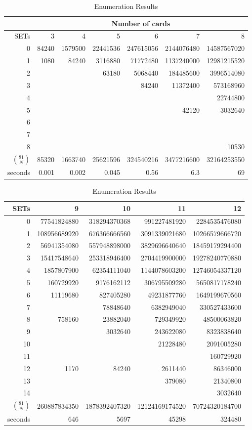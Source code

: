 \documentclass{article}
\theoremstyle{theorem}
\theoremstyle{definition}
\begin{document}
\begin{table}
  \caption{Enumeration Results}\label{THE_TABLE}
  \centering
  \begin{tabular}{r | r r r r r r }
    & \multicolumn{6}{c}{Number of cards} \\
    \hline\hline
    SETs & 3 & 4 & 5 & 6 & 7 & 8   \\
    \hline
0  & 84240 & 1579500 & 22441536 & 247615056 & 2144076480 & 14587567020  \\
1  & 1080 & 84240 & 3116880 & 71772480 & 1137240000 & 12981215520 \\
2  &  &  & 63180 & 5068440 & 184485600 & 3996514080 \\
3  &  &  &  & 84240 & 11372400 & 573168960 \\
4  &  &  &  &  &  & 22744800 \\
5  &  &  &  &  & 42120 & 3032640 \\
6  &  &  &  &  &  &  \\
7  &  &  &  &  &  &  \\
8  &  &  &  &  &  & 10530 \\
\hline
$\binom{81}{N}$ & 85320 & 1663740 & 25621596 & 324540216 & 3477216600 & 32164253550  \\
\hline
seconds & 0.001 & 0.002 & 0.045 & 0.56 & 6.3 & 69 
  \end{tabular}

  \vskip 5mm

  \begin{tabular}{r | r r r r }
    SETs & 9 & 10 & 11 & 12 \\
    \hline
0  & 77541824880 & 318294370368 & 991227481920 & 2284535476080 \\
1  & 108956689920 & 676366666560 & 3091339021680 & 10266579666720 \\
2  & 56941354080 & 557948898000 & 3829696640640 & 18459179294400 \\
3  & 15417548640 & 253318946400 & 2704419900000 & 19278240770880 \\
4  & 1857807900 & 62354111040 & 1144078603200 & 12746054337120 \\
5  & 160729920 & 9176162112 & 306795509280 & 5650817178240 \\
6  & 11119680 & 827405280 & 49231877760 & 1649199670560 \\
7  & & 78848640 & 6382949040 & 330527433600 \\
8  & 758160 & 23882040 & 729349920 & 48500063820 \\
9  &  & 3032640 & 243622080 & 8323838640 \\
10 &  &  & 21228480 & 2091005280 \\
11 &  &  & & 160729920 \\
12 & 1170 & 84240 & 2611440 & 86346000 \\
13 &  &  & 379080 & 21340800 \\
14 &  &  &  & 3032640 \\
\hline
$\binom{81}{N}$ & 260887834350 & 1878392407320 & 12124169174520 & 70724320184700 \\
\hline
seconds & 646 & 5697 & 45298 & 324480
  \end{tabular}
\end{table}
\end{document}
